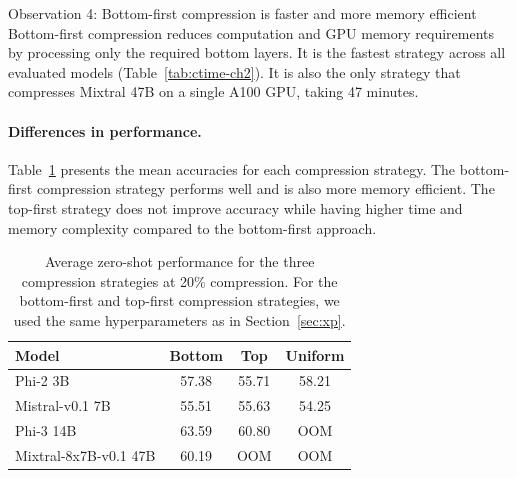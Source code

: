 \begin{insightbox}{Observation 4: Bottom-first compression is faster and more memory efficient}
Bottom-first compression reduces computation and GPU memory requirements by processing only the required bottom layers. It is the fastest strategy across all evaluated models (Table~\ref{tab:ctime-ch2}). It is also the only strategy that compresses Mixtral 47B on a single A100 GPU, taking 47 minutes.
\end{insightbox}

\paragraph{Differences in performance.}
Table~\ref{tab:cacc-ch2} presents the mean accuracies for each compression strategy. The bottom-first compression strategy performs well and is also more memory efficient. The top-first strategy does not improve accuracy while having higher time and memory complexity compared to the bottom-first approach.

\begin{table}[!ht]
    {\small{
    \begin{tabular}{lccc}
    \toprule
    \textbf{Model} & \textbf{Bottom} & \textbf{Top} & \textbf{Uniform} \\
    \midrule
    Phi-2 3B & 57.38 & 55.71 & 58.21 \\
    Mistral-v0.1 7B & 55.51 & 55.63 & 54.25 \\
    Phi-3 14B & 63.59 & 60.80 & OOM \\
    Mixtral-8x7B-v0.1 47B & 60.19 & OOM & OOM \\
    \bottomrule
    \end{tabular}
    }}
    \caption{Average zero-shot performance for the three compression strategies at 20\% compression. For the bottom-first and top-first compression strategies, we used the same hyperparameters as in Section~\ref{sec:xp}.}
    \label{tab:cacc-ch2}
\end{table}

